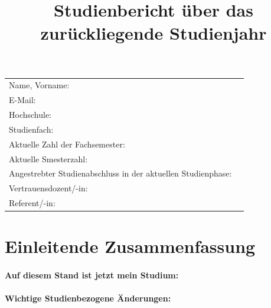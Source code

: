 \documentclass[]{scrartcl}
\title{Studienbericht über das zurückliegende Studienjahr}
\date{}
\begin{document}
\maketitle

\begin{tabular}{p{}p{}}
    Name, Vorname: & \\
    E-Mail: & \texttt{} \\
    Hochschule: & \\
    Studienfach: & \\
    Aktuelle Zahl der Fachsemester: & \\
    Aktuelle Smesterzahl: & \\ %
    Angestrebter Studienabschluss in der aktuellen Studienphase: & \\ %
    Vertrauensdozent/-in: & \\
    Referent/-in: & \\
\end{tabular}


\section*{Einleitende Zusammenfassung}

\paragraph{Auf diesem Stand ist jetzt mein Studium:}

\paragraph{Wichtige Studienbezogene Änderungen:}
%
\end{document}
